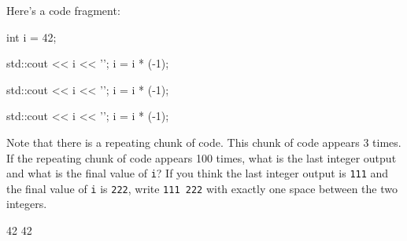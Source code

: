 \nextq
Here's a code fragment:
\begin{console}[commandchars=\@\{\},fontsize=\footnotesize]
int i = 42;

std::cout << i << '\n';
i = i * (-1);

std::cout << i << '\n';
i = i * (-1);

std::cout << i << '\n';
i = i * (-1);
\end{console}
Note that there is a repeating chunk of code.
This chunk of code appears 3 times.
\\
If the repeating chunk of code appears 100 times,
what is the last integer output and
what is the final value of \verb!i!?
If you think the last integer output is \verb!111! and the final
value of \verb!i! is \verb!222!, write \verb!111 222! with
exactly one space between the two integers.
\\
\ANSWER
\begin{answercode}
42 42
\end{answercode}



